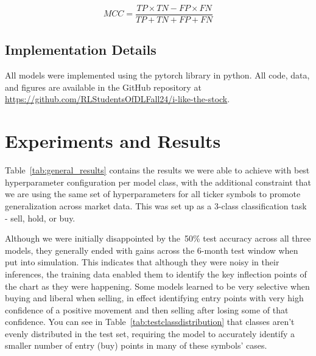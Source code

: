\documentclass[10pt,twocolumn,letterpaper]{article}
\begin{document}
\begin{equation} \label{eq:mcc}
    MCC = \frac{TP \times TN - FP \times FN}{TP + TN + FP + FN}
\end{equation}

\subsection{Implementation Details}

All models were implemented using the pytorch library in python\cite{paszke2017automatic}. All code, data, and figures are available in the GitHub repository at \url{https://github.com/RLStudentsOfDLFall24/i-like-the-stock}.


\section{Experiments and Results}

Table~\ref{tab:general_results} contains the results we were able to achieve with best hyperparameter configuration per model class, with the additional constraint that we are using the same set of hyperparameters for all ticker symbols to promote generalization across market data. This was set up as a 3-class classification task - sell, hold, or buy.

\begin{table}
\begin{center}
\end{center}
\caption{Data splits and time frames.}
\label{tab:general_results}
\end{table}

Although we were initially disappointed by the~50\% test accuracy across all three models, they generally ended with gains across the 6-month test window when put into simulation. This indicates that although they were noisy in their inferences, the training data enabled them to identify the key inflection points of the chart as they were happening. Some models learned to be very selective when buying and liberal when selling, in effect identifying entry points with very high confidence of a positive movement and then selling after losing some of that confidence. You can see in Table~\ref{tab:testclassdistribution} that classes aren't evenly distributed in the test set, requiring the model to accurately identify a smaller number of entry (buy) points in many of these symbols' cases.
\end{document}
